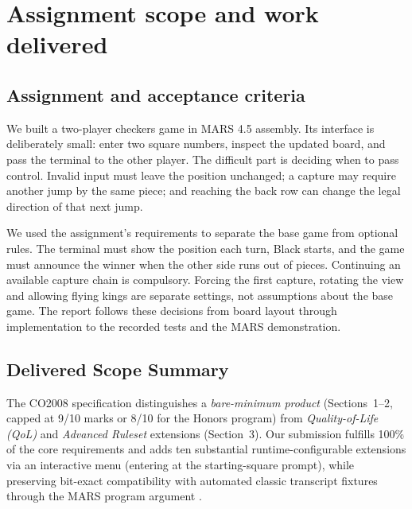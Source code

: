 \section{Assignment scope and work delivered}
\label{sec:intro}

\subsection{Assignment and acceptance criteria}
We built a two-player checkers game in MARS 4.5 assembly. Its interface is deliberately small: enter two square numbers, inspect the updated board, and pass the terminal to the other player. The difficult part is deciding when to pass control. Invalid input must leave the position unchanged; a capture may require another jump by the same piece; and reaching the back row can change the legal direction of that next jump.

We used the assignment's requirements to separate the base game from optional rules. The terminal must show the position each turn, Black starts, and the game must announce the winner when the other side runs out of pieces. Continuing an available capture chain is compulsory. Forcing the first capture, rotating the view and allowing flying kings are separate settings, not assumptions about the base game. The report follows these decisions from board layout through implementation to the recorded tests and the MARS demonstration.

\subsection{Delivered Scope Summary}
The CO2008 specification distinguishes a \emph{bare-minimum product} (Sections~1--2, capped at 9/10 marks or 8/10 for the Honors program) from \emph{Quality-of-Life (QoL)} and \emph{Advanced Ruleset} extensions (Section~3). Our submission fulfills 100\% of the core requirements and adds ten substantial runtime-configurable extensions via an interactive menu (entering  at the starting-square prompt), while preserving bit-exact compatibility with automated classic transcript fixtures through the MARS program argument .

